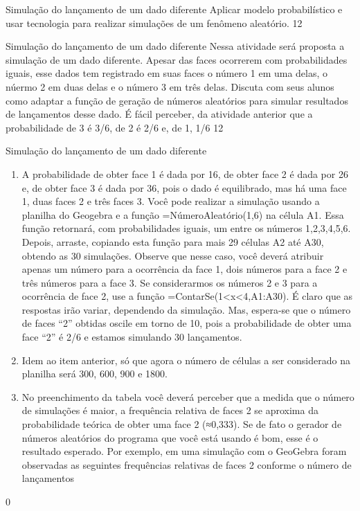 \begin{objectives}{Simulação do lançamento de um dado diferente}
{
Aplicar modelo probabilístico e usar tecnologia para realizar simulações de um fenômeno aleatório.
}{1}{2}
\end{objectives}
\begin{sugestions}{Simulação do lançamento de um dado diferente}
{
Nessa atividade será proposta a simulação de um dado diferente. Apesar das faces ocorrerem com probabilidades iguais, esse dados tem registrado em suas faces o número 1 em uma delas, o núermo 2 em duas delas e o número 3 em três delas. Discuta com seus alunos como adaptar a função de geração de números aleatórios para simular resultados de lançamentos desse dado. É fácil perceber, da atividade anterior que a probabilidade de 3 é 3/6, de 2 é 2/6 e, de 1, 1/6
}{1}{2}
\end{sugestions}
\begin{answer}{Simulação do lançamento de um dado diferente}
{
\begin{enumerate}
\item A probabilidade de obter face 1 é dada por 16, de obter face 2 é dada por 26 e, de obter face 3 é dada por 36, pois o dado é equilibrado, mas há uma face 1, duas faces 2 e três faces 3.
Você pode realizar a simulação usando a planilha do Geogebra e a função =NúmeroAleatório(1,6) na célula A1. Essa função retornará, com probabilidades iguais, um entre os números 1,2,3,4,5,6. Depois, arraste, copiando esta função para mais 29 células A2 até A30, obtendo as 30 simulações. Observe que nesse caso, você deverá atribuir apenas um número para a ocorrência da face 1, dois números para a face 2 e três números para a face 3. Se considerarmos os números 2 e 3 para a ocorrência de face 2, use a função =ContarSe(1<x<4,A1:A30). É claro que as respostas irão variar, dependendo da simulação. Mas, espera-se que o número de faces “2” obtidas oscile em torno de 10, pois a probabilidade de obter uma face “2” é 2/6 e estamos simulando 30 lançamentos.

\item Idem ao item anterior, só que agora o número de células a ser considerado na planilha será 300, 600, 900 e 1800.

\item No preenchimento da tabela você deverá perceber que a medida que o número de simulações é maior, a frequência relativa de faces 2 se aproxima da probabilidade teórica de obter uma face 2 (≈0,333). Se de fato o gerador de números aleatórios do programa que você está usando é bom, esse é o resultado esperado. Por exemplo, em uma simulação com o GeoGebra foram observadas as seguintes frequências relativas de faces 2 conforme o número de lançamentos
\end{enumerate}
}{0}
\end{answer}

